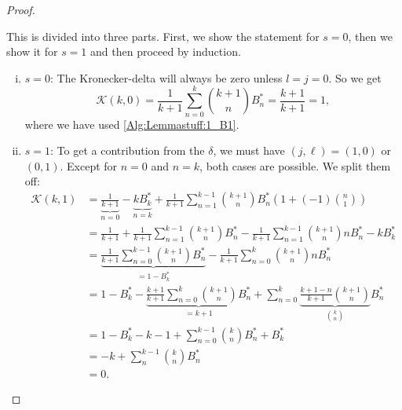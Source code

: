 \begin{proof}
	\begin{subproof}
		This is divided into three parts. First, we show the statement for 
		$s=0$, then we show it for $s=1$ and then proceed by induction.
		\begin{enumerate}[(i)]
		  \item $s=0$:
			The Kronecker-delta will always be zero unless $l=j=0$. So we get
			\begin{equation*}
				\mathcal{K}(k,0)
				=
				\frac{1}{k+1} \sum\limits_{n=0}^k
				\binom{k+1}{n} B_n^*
				=
				\frac{k+1}{k+1}
				=
				1,
			\end{equation*}
			where we have used \eqref{Alg:Lemmastuff:1_B1}.

			\item $s=1$:
			To get a contribution from the $\delta$, we must have 
			$(j, \ell) = (1,0)$ or $(0,1)$. Except for $n=0$ and $n=k$, 
			both cases are possible. We split them off:
			\begin{align*}
				\mathcal{K}(k,1)
				& = 
				\underbrace{\frac{1}{k+1}}_{n=0}
				- \underbrace{k B_k^*}_{n=k}
				+ \frac{1}{k+1}
				\sum\limits_{n=1}^{k-1}
				\binom{k+1}{n}B_n^*
				\left(1 + (-1) \binom{n}{1} \right)\\
				& = 
				\frac{1}{k+1}
				+ \frac{1}{k+1} \sum\limits_{n=1}^{k-1}
				\binom{k+1}{n}B_n^* 
				- \frac{1}{k+1}	\sum\limits_{n=1}^{k-1}
				\binom{k+1}{n}n B_n^* 
				- k B_k^* \\
				& = 
				\underbrace{
					\frac{1}{k+1}
					\sum\limits_{n=0}^{k-1}
					\binom{k + 1}{n}
					B_n^*
				}_{ = 1 - B_k^*} 
				- \frac{1}{k+1} \sum\limits_{n=0}^k
				\binom{k+1}{n}n B_n^*
				\\
				& =
				1 - B_k^* 
				- \underbrace{\frac{k+1}{k+1}
				\sum\limits_{n=0}^k
				\binom{k+1}{n} B_n^*}_{ = k+1}
				+ \sum\limits_{n=0}^k 
				\underbrace{\frac{k+1-n}{k+1}
				\binom{k+1}{n}}_{\binom{k}{n}} B_n^*
				\\
				& = 
				1 - B_k^* - k - 1 
				+ \sum\limits_{n=0}^{k-1}
				\binom{k}{n} B_n^* + B_k^*
				\\
				& =
				- k + 
				\sum\limits_{n}^{k-1} 
				\binom{k}{n} B_n^*
				\\
				& = 
				0.
			\end{align*}
	

\end{enumerate}
\end{subproof}
\end{proof}
